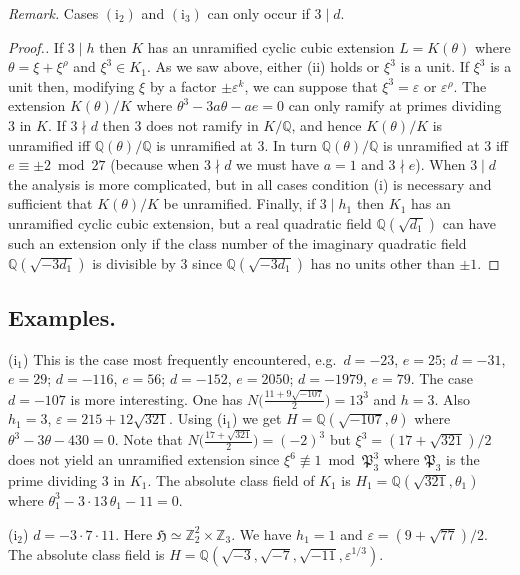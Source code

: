 \noindent\emph{Remark.} Cases $(\mathrm{i}_{2})$ and
$(\mathrm{i}_{3})$ can only occur if $3\mid d$.

\begin{proof}[Proof.]
If $3\mid h$ then $K$ has an unramified cyclic cubic extension
$L=K(\theta)$ where $\theta=\xi+\xi^{\rho}$ and $\xi^{3}\in K_{1}$. As we
saw above, either (ii) holds or $\xi^{3}$ is a unit. If $\xi^{3}$ is a
unit then, modifying $\xi$ by a factor $\pm\varepsilon^{k}$, we can
suppose that $\xi^{3}=\varepsilon$ or $\varepsilon^{\rho}$. The extension
$K(\theta)/K$ where $\theta^{3}-3a\theta-ae=0$ can only ramify at primes
dividing $3$ in $K$. If $3\nmid d$ then $3$ does not ramify in
$K/\mathbb{Q}$, and hence $K(\theta)/K$ is unramified iff
$\mathbb{Q}(\theta)/\mathbb{Q}$ is unramified at $3$. In turn
$\mathbb{Q}(\theta)/\mathbb{Q}$ is unramified at $3$ iff
$e\equiv\pm 2\bmod 27$ (because when $3\nmid d$ we must have $a=1$ and
$3\nmid e$). When $3\mid d$ the analysis is more complicated, but in all
cases condition (i) is necessary and sufficient that $K(\theta)/K$ be
unramified. Finally, if $3\mid h_{1}$ then $K_{1}$ has an unramified
cyclic cubic extension, but a real quadratic field
$\mathbb{Q}(\sqrt{d_{1}})$ can have such an extension only if the class
number of the imaginary quadratic field $\mathbb{Q}(\sqrt{-3d_{1}})$ is
divisible by $3$ since $\mathbb{Q}(\sqrt{-3d_{1}})$ has no units other
than $\pm 1$.
\end{proof}

\subsection*{Examples.}

\noindent
($\mathrm{i}_{1}$) This is the case most frequently encountered, e.g.\
$d=-23$, $e=25$; $d=-31$, $e=29$; $d=-116$, $e=56$; $d=-152$,
$e=2050$; $d=-1979$, $e=79$. The case $d=-107$ is more interesting. One
has $N\bigl(\frac{11+9\sqrt{-107}}{2}\bigr)=13^{3}$ and $h=3$. Also
$h_{1}=3$, $\varepsilon=215+12\sqrt{321}$. Using ($\mathrm{i}_{1}$) we
get $H=\mathbb{Q}(\sqrt{-107},\theta)$ where $\theta^{3}-3\theta-430=0$.
Note that $N\bigl(\frac{17+\sqrt{321}}{2}\bigr)=(-2)^{3}$ but
$\xi^{3}=(17+\sqrt{321})/2$ does not yield an unramified extension since
$\xi^{6}\not\equiv 1\bmod\mathfrak{P}_{3}^{3}$ where $\mathfrak{P}_{3}$
is the prime dividing $3$ in $K_{1}$. The absolute class field of $K_{1}$
is $H_{1}=\mathbb{Q}(\sqrt{321},\theta_{1})$ where
$\theta_{1}^{3}-3\cdot 13\,\theta_{1}-11=0$.

\medskip\noindent
($\mathrm{i}_{2}$) $d=-3\cdot 7\cdot 11$. Here
$\mathfrak{H}\simeq\mathbb{Z}_{2}^{2}\times\mathbb{Z}_{3}$. We have
$h_{1}=1$ and $\varepsilon=(9+\sqrt{77})/2$. The absolute class field is
$H=\mathbb{Q}(\sqrt{-3},\sqrt{-7},\sqrt{-11},\varepsilon^{1/3})$.

